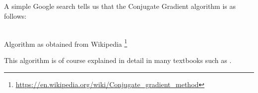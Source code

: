 A simple Google search tells us that the Conjugate Gradient algorithm is as follows:
\begin{center}
\\
Algorithm as obtained from Wikipedia \footnote{\url{https://en.wikipedia.org/wiki/Conjugate\_gradient\_method}}
\end{center}
This algorithm is of course explained in detail in many textbooks such as \cite{saad}.

